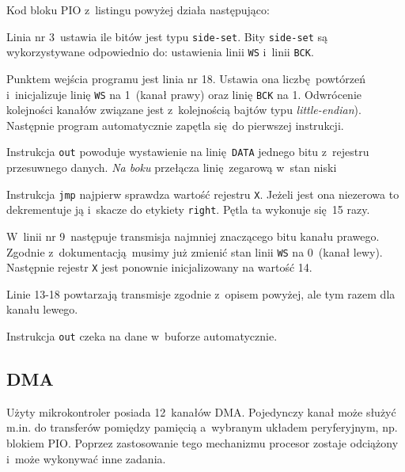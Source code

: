 \documentclass[polish]{aghengthesis}
\let\tempone\itemize
\let\temptwo\enditemize
\renewenvironment{itemize}{\tempone\setlength{\itemsep}{0cm}}{\temptwo}
\begin{document}
			\noindent
			Kod bloku PIO z~listingu powyżej działa następująco:
			\begin{itemize}
				\item Linia nr 3~ustawia ile bitów jest typu \lstinline|side-set|. Bity \lstinline|side-set| są wykorzystywane odpowiednio do: ustawienia linii \lstinline|WS| i~linii \lstinline|BCK|.
				
				\item Punktem wejścia programu jest linia nr 18. Ustawia ona liczbę powtórzeń i~inicjalizuje linię \lstinline|WS| na 1~(kanał prawy) oraz linię \lstinline|BCK| na 1. Odwrócenie kolejności kanałów związane jest z~kolejnością bajtów typu \textit{little-endian}). Następnie program automatycznie zapętla się do pierwszej instrukcji.
				
				\item Instrukcja \lstinline|out| powoduje wystawienie na linię \lstinline|DATA| jednego bitu z~rejestru przesuwnego danych. \textit{Na boku} przełącza linię zegarową w~stan niski
				
				\item Instrukcja \lstinline|jmp| najpierw sprawdza wartość rejestru \lstinline|X|. Jeżeli jest ona niezerowa to dekrementuje ją i~skacze do etykiety \lstinline|right|. Pętla ta wykonuje się 15 razy.
				
				\item W~linii nr 9~następuje transmisja najmniej znaczącego bitu kanału prawego. Zgodnie z~dokumentacją musimy już zmienić stan linii \lstinline|WS| na 0~(kanał lewy). Następnie rejestr \lstinline|X| jest ponownie inicjalizowany na wartość 14.
				
				\item Linie 13-18 powtarzają transmisje zgodnie z~opisem powyżej, ale tym razem dla kanału lewego.
			\end{itemize}
			
			Instrukcja \lstinline|out| czeka na dane w~buforze automatycznie.
		
		\subsection{DMA}
			Użyty mikrokontroler posiada 12~kanałów DMA.
			Pojedynczy kanał może służyć m.in. do transferów pomiędzy pamięcią a~wybranym układem peryferyjnym, np. blokiem PIO.
			Poprzez zastosowanie tego mechanizmu procesor zostaje odciążony i~może wykonywać inne zadania.
			$ $\\
			
\end{document}

